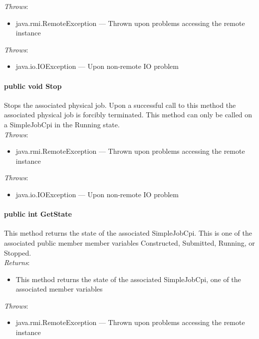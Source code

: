 \documentclass[$Date: 2003/06/26 19:29:31 $]{glabarticle}
\begin{document}
 \textit{Throws}:
 \begin{itemize}
 \item[] java.rmi.RemoteException --- Thrown upon problems accessing the remote instance 
 \end{itemize}
 
\textit{Throws}:
\begin{itemize}
\item[] java.io.IOException --- Upon non-remote IO problem 
\end{itemize}

\paragraph{public void Stop}

Stops the associated physical job. Upon a successful call to this
method the associated physical job is forcibly terminated. This method
can only be called on a SimpleJobCpi in the Running state. \\

 \textit{Throws}:
 \begin{itemize}
 \item[] java.rmi.RemoteException --- Thrown upon problems accessing the remote instance 
 \end{itemize}
 
\textit{Throws}:
\begin{itemize}
\item[] java.io.IOException --- Upon non-remote IO problem 
\end{itemize}

\paragraph{public int GetState}

This method returns the state of the associated SimpleJobCpi. This is one
of the associated public member member variables Constructed,
Submitted, Running, or Stopped. \\

 \textit{Returns}:
 \begin{itemize}
 \item[] This method returns the state of the associated SimpleJobCpi, one of the associated member variables
 \end{itemize} 

 \textit{Throws}:
 \begin{itemize}
 \item[] java.rmi.RemoteException --- Thrown upon problems accessing the remote instance 
 \end{itemize}
 
\end{document}
